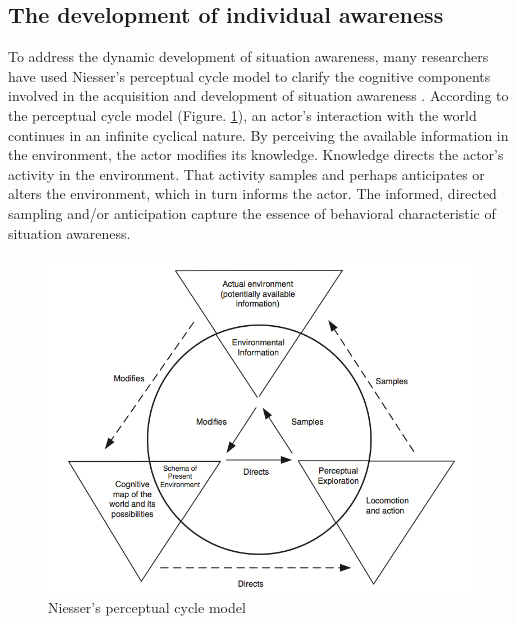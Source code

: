 \subsection{The development of individual awareness} %
\label{sub:awareness_as_process}
To address the dynamic development of situation awareness, many researchers have used Niesser's perceptual cycle model \cite{neisser1976cognition} to clarify the cognitive components involved in the acquisition and development of situation awareness \cite{Smith1995,Adams1995,Gutwin2002,Stanton2009}. According to the perceptual cycle model (Figure. \ref{fig:perceptual_cycle}), an actor's interaction with the world continues in an infinite cyclical nature. By perceiving the available information in the environment, the actor modifies its knowledge. Knowledge directs the actor's activity in the environment. That activity samples and perhaps anticipates or alters the environment, which in turn informs the actor. The informed, directed sampling and/or anticipation capture the essence of behavioral characteristic of situation awareness.

\begin{figure}[htbp] %
   \centering
   \includegraphics[width=4.5in]{perceptual_cycle.jpg} 
   \caption{Niesser's perceptual cycle model \cite{Salmon2008}}
   \label{fig:perceptual_cycle}
\end{figure}

